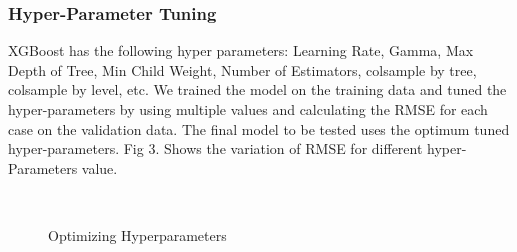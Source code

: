 \usepackage{fancyhdr}\documentclass[conference]{IEEEtran}
\begin{document}
\subsubsection{Hyper-Parameter Tuning}
XGBoost has the following hyper parameters: Learning Rate, Gamma, Max Depth of Tree, Min Child Weight, Number of Estimators, colsample by tree, colsample by level, etc\cite{7}. We trained the model on the training data and tuned the hyper-parameters by using multiple values and calculating the RMSE for each case on the validation data. The final model to be tested uses the optimum tuned hyper-parameters\cite{6}. Fig 3. Shows the variation of RMSE for different hyper-Parameters value.
\begin{figure}[h]
    \centering
    \\
    \caption{Optimizing Hyperparameters}
    \label{fig:sample_subfigures}
\end{figure}
\end{document}
